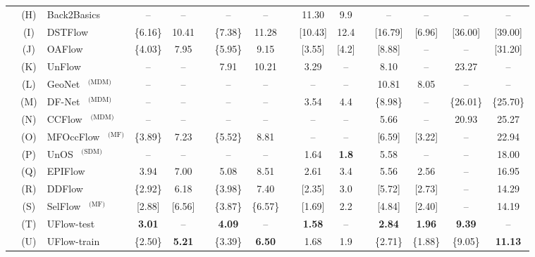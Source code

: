 \documentclass[runningheads]{llncs}
\begin{document}
\begin{table}[t]
{\begin{tabular}{lcl cc c cc c cc c cccc}
        &(H)& Back2Basics \cite{jjyu2016unsupflow} & -- & -- && -- & -- && 11.30 & 9.9 && -- & -- & -- & -- \\ &(I)& DSTFlow \cite{ren2017unsupervised} & \{6.16\} & 10.41 && \{7.38\} & 11.28 && [10.43] & 12.4 && [16.79] & [6.96] & [36.00] & [39.00]\\ &(J)& OAFlow \cite{wang2018occlusion}& \{4.03\} & 7.95 && \{5.95\} & 9.15 && [3.55] & [4.2]  && [8.88] & -- & -- & [31.20] \\ &(K)& UnFlow \cite{meister2018unflow} & -- & -- && 7.91 & 10.21 && 3.29 & -- && 8.10 &--& 23.27 & --\\ &(L)& GeoNet \cite{yin2018geonet}~$^{\text{(MDM)}}$ &--&--&&--&-- && --&--&& 10.81 & 8.05 &-- & --\\  &(M)& DF-Net \cite{zou2018dfnet}~$^{\text{(MDM)}}$& -- & -- && -- & -- && 3.54 & 4.4 && \{8.98\} & -- & \{26.01\} & \{25.70\}\\ &(N)& CCFlow \cite{ranjan2019cvpr}~$^{\text{(MDM)}}$ &--&--&&--&-- &&--&-- && 5.66 &-- & 20.93 & 25.27 \\ &(O)& MFOccFlow \cite{Janai2018ECCV}~$^{\text{(MF)}}$ & \{3.89\} & 7.23 && \{5.52\} & 8.81 && --& --&& [6.59] & [3.22] & -- & 22.94\\ &(P) & UnOS \cite{wang2018unos}~$^{\text{(SDM)}}$ &--&--&&--&-- && 1.64 & {\bf 1.8} && 5.58 & -- & -- & 18.00\\ &(Q)& EPIFlow \cite{Zhong2019UnsupervisedDE} & 3.94 & 7.00 && 5.08 & 8.51 && 2.61 & 3.4 && 5.56 & 2.56 & -- & 16.95 \\ &(R)& DDFlow \cite{DDFlow} & \{2.92\} & 6.18 && \{3.98\} & 7.40 && [2.35] & 3.0 && [5.72] & [2.73] & -- & 14.29 \\ &(S)& SelFlow \cite{SelFlow}~$^{\text{(MF)}}$ & [2.88] & [6.56] && \{3.87\} & \{6.57\} && [1.69] & 2.2 && [4.84] & [2.40] & -- & 14.19  \\ \rowcolor{lightyellow} & (T) & UFlow-test & {\bf 3.01} & -- && {\bf 4.09} & -- && {\bf 1.58} & -- && {\bf 2.84} & {\bf 1.96} & {\bf 9.39} & -- \\
        \rowcolor{lightyellow} & (U) & UFlow-train & \{2.50\} & {\bf 5.21} && \{3.39\} & {\bf 6.50} && 1.68 & 1.9 && \{2.71\} & \{1.88\} & \{9.05\} & {\bf 11.13} \\
        \bottomrule
	\end{tabular}}
\end{table}
\end{document}
